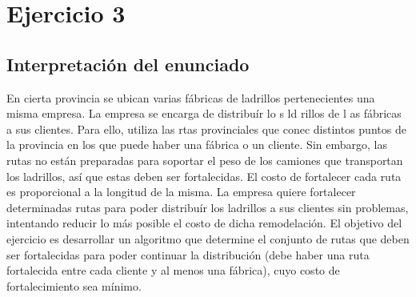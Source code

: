 \section{Ejercicio 3}
\subsection{Interpretación del enunciado}
\par{En cierta provincia se ubican varias fábricas de ladrillos pertenecientes
  una misma empresa. La empresa se encarga de distribuír  lo s ld rillos de l
as fábricas a sus clientes. Para ello, utiliza las rtas provinciales que conec                                                                                                                                                                                                                                                                                         
distintos puntos de la provincia en los que puede haber una fábrica o un
cliente. Sin embargo, las rutas no están preparadas para soportar el peso de
los camiones que transportan los ladrillos, así que estas deben ser
fortalecidas. El costo de fortalecer cada ruta es proporcional a la longitud de
la misma. La empresa quiere fortalecer determinadas rutas para poder distribuír
los ladrillos a sus clientes sin problemas, intentando reducir lo más posible
el costo de dicha remodelación. El objetivo del ejercicio es desarrollar un
algoritmo que determine el conjunto de rutas que deben ser fortalecidas para
poder continuar la distribución (debe haber una ruta fortalecida entre cada
cliente y al menos una fábrica), cuyo costo de fortalecimiento sea mínimo.}
